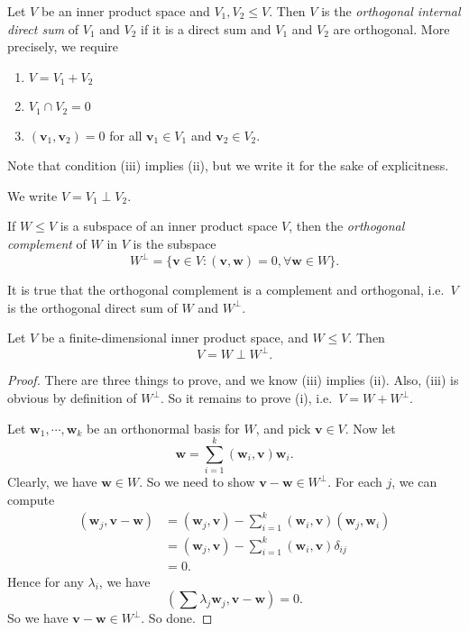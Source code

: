 \documentclass[a4paper]{article}
\begin{document}
\begin{defi}
  Let $V$ be an inner product space and $V_1, V_2 \leq V$. Then $V$ is the \emph{orthogonal internal direct sum} of $V_1$ and $V_2$ if it is a direct sum and $V_1$ and $V_2$ are orthogonal. More precisely, we require
  \begin{enumerate}
    \item $V = V_1 + V_2$
    \item $V_1 \cap V_2 = 0$
    \item $(\mathbf{v}_1, \mathbf{v}_2) = 0$ for all $\mathbf{v}_1 \in V_1$ and $\mathbf{v}_2 \in V_2$.
  \end{enumerate}
  Note that condition (iii) implies (ii), but we write it for the sake of explicitness.

  We write $V = V_1 \perp V_2$.
\end{defi}

\begin{defi}
  If $W \leq V$ is a subspace of an inner product space $V$, then the \emph{orthogonal complement} of $W$ in $V$ is the subspace
  \[
    W^\perp = \{\mathbf{v} \in V: (\mathbf{v}, \mathbf{w}) = 0, \forall \mathbf{w} \in W\}.
  \]
\end{defi}
It is true that the orthogonal complement is a complement and orthogonal, i.e.\ $V$ is the orthogonal direct sum of $W$ and $W^\perp$.

\begin{prop}
  Let $V$ be a finite-dimensional inner product space, and $W \leq V$. Then
  \[
    V = W \perp W^\perp.
  \]
\end{prop}

\begin{proof}
  There are three things to prove, and we know (iii) implies (ii). Also, (iii) is obvious by definition of $W^\perp$. So it remains to prove (i), i.e.\ $V = W + W^\perp$.

  Let $\mathbf{w}_1, \cdots, \mathbf{w}_k$ be an orthonormal basis for $W$, and pick $\mathbf{v}\in V$. Now let
  \[
    \mathbf{w} = \sum_{i = 1}^k (\mathbf{w}_i, \mathbf{v}) \mathbf{w}_i.
  \]
  Clearly, we have $\mathbf{w} \in W$. So we need to show $\mathbf{v} - \mathbf{w} \in W^\perp$. For each $j$, we can compute
  \begin{align*}
    (\mathbf{w}_j, \mathbf{v} - \mathbf{w}) &= (\mathbf{w}_j, \mathbf{v}) - \sum_{i = 1}^k (\mathbf{w}_i, \mathbf{v})(\mathbf{w}_j, \mathbf{w}_i)\\
    &= (\mathbf{w}_j, \mathbf{v}) - \sum_{i = 1}^k (\mathbf{w}_i, \mathbf{v}) \delta_{ij}\\
    &= 0.
  \end{align*}
  Hence for any $\lambda_i$, we have
  \[
    \left(\sum \lambda_j \mathbf{w}_j, \mathbf{v} - \mathbf{w}\right) = 0.
  \]
  So we have $\mathbf{v}-\mathbf{w} \in W^\perp$. So done.
\end{proof}
\end{document}
